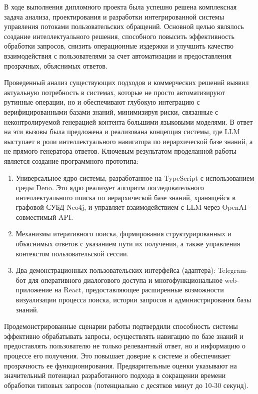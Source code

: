 
В ходе выполнения дипломного проекта была успешно решена комплексная задача анализа, проектирования и разработки интегрированной системы управления потоками пользовательских обращений. Основной целью являлось создание интеллектуального решения, способного повысить эффективность обработки запросов, снизить операционные издержки и улучшить качество взаимодействия с пользователями за счет автоматизации и предоставления прозрачных, объяснимых ответов.

Проведенный анализ существующих подходов и коммерческих решений выявил актуальную потребность в системах, которые не просто автоматизируют рутинные операции, но и обеспечивают глубокую интеграцию с верифицированными базами знаний, минимизируя риски, связанные с неконтролируемой генерацией контента большими языковыми моделями. В ответ на эти вызовы была предложена и реализована концепция системы, где LLM выступает в роли интеллектуального навигатора по иерархической базе знаний, а не прямого генератора ответов.
Ключевым результатом проделанной работы является создание программного прототипа:


\begin{enumerate}[label=\arabic*.]
    \item Универсальное ядро системы, разработанное на TypeScript с использованием среды Deno. Это ядро реализует алгоритм последовательного интеллектуального поиска по иерархической базе знаний, хранящейся в графовой СУБД Neo4j, и управляет взаимодействием с LLM через OpenAI-совместимый API.
    \item Механизмы итеративного поиска, формирования структурированных и объяснимых ответов с указанием пути их получения, а также управления контекстом пользовательской сессии.
    \item Два демонстрационных пользовательских интерфейса (адаптера): Telegram-бот для оперативного диалогового доступа и многофункциональное web-приложение на React, предоставляющее расширенные возможности визуализации процесса поиска, истории запросов и администрирования базы знаний.
\end{enumerate}

Продемонстрированные сценарии работы подтвердили способность системы эффективно обрабатывать запросы, осуществлять навигацию по базе знаний и предоставлять пользователю не только релевантный ответ, но и информацию о процессе его получения. Это повышает доверие к системе и обеспечивает прозрачность ее функционирования. Предварительные оценки указывают на значительный потенциал разработанного подхода в сокращении времени обработки типовых запросов (потенциально с десятков минут до 10-30 секунд).

